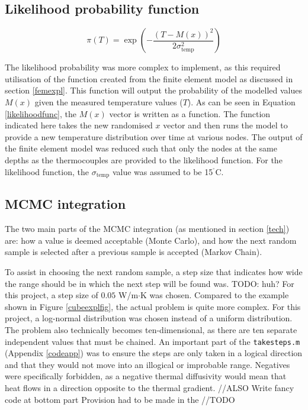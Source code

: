 	\subsection{Likelihood probability function}
		\begin{equation}
		\label{likelihoodfunc}
		\pi(T) = \exp\left(-\frac{\left(T-M(x)\right)^2}{2\sigma_{\text{temp}}^2}\right)
		\end{equation}
		
		The likelihood probability was more complex to implement, as this required utilisation of the function created from the finite element model as discussed in section \ref{femexpl}.
		This function will output the probability of the modelled values $M(x)$ given the measured temperature values ($T$).
		As can be seen in Equation \ref{likelihoodfunc}, the $M(x)$ vector is written as a function.
		The function indicated here takes the new randomised $x$ vector and then runs the model to provide a new temperature distribution over time at various nodes.
		The output of the finite element model was reduced such that only the nodes at the same depths as the thermocouples are provided to the likelihood function.
		For the likelihood function, the $\sigma_{\text{temp}}$ value was assumed to be 15$^{^\circ}$C.
		 

	\subsection{MCMC integration}\label{mcmcexp}
	The two main parts of the MCMC integration (as mentioned in section \ref{tech}) are: how a value is deemed acceptable (Monte Carlo), and how the next random sample is selected after a previous sample is accepted (Markov Chain).
	
	To assist in choosing the next random sample, a step size that indicates how wide the range should be in which the next step will be found was.   TODO: huh?
	For this project, a step size of $0.05$ W/m$\cdot$K was chosen.
	Compared to the example shown in Figure \ref{cubeexplfig}, the actual problem is quite more complex. 
	For this project, a log-normal distribution was chosen instead of a uniform distribution.
	The problem also technically becomes ten-dimensional, as there are ten separate independent values that must be chained.
	An important part of the \texttt{takesteps.m} (Appendix \ref{codeapp}) was to ensure the steps are only taken in a logical direction and that they would not move into an illogical or improbable range.
	Negatives were specifically forbidden, as a negative thermal diffusivity would mean that heat flows in a direction opposite to the thermal gradient.
	//ALSO Write fancy code at bottom part
	Provision had to be made in the //TODO

